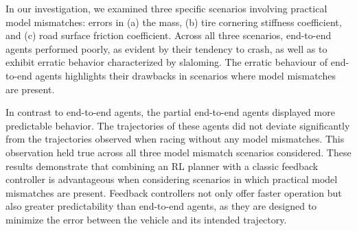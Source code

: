 In our investigation, we examined three specific scenarios involving practical model mismatches: errors in (a) the mass, (b) tire cornering stiffness coefficient, and (c) road surface friction coefficient. 
Across all three scenarios, end-to-end agents performed poorly, as evident by their tendency to crash, as well as to exhibit erratic behavior characterized by slaloming.
The erratic behaviour of end-to-end agents highlights their drawbacks in scenarios where model mismatches are present.


In contrast to end-to-end agents, the partial end-to-end agents displayed more predictable behavior.
The trajectories of these agents did not deviate significantly from the trajectories observed when racing without any model mismatches.
This observation held true across all three model mismatch scenarios considered.
These results demonstrate that combining an RL planner with a classic feedback controller is advantageous when considering scenarios in which practical model mismatches are present.
Feedback controllers not only offer faster operation but also greater predictability than end-to-end agents, as they are designed to minimize the error between the vehicle and its intended trajectory.